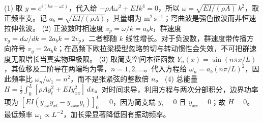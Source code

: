(1) 取 \(y=e^{i(kx-\omega t)}\)，代入给 \(-\rho A\omega^2+EI k^4=0\)，所以 \(\omega=\sqrt{EI/(\rho A)}\,k^2\)，取正频率支。记 \(a_b=\sqrt{EI/(\rho A)}\)，其量纲为 \(\mathrm{m^2\,s^{-1}}\)；弯曲波是强色散波而非恒速拉伸弦波。
(2) 正波数时相速度 \(v_p=\omega/k=a_b k\)，群速度 \(v_g=d\omega/dk=2a_bk=2v_p\)，二者都随 \(k\) 线性增长。对于负波数，群速度带传播方向符号 \(v_g=2a_bk\)；在高频下欧拉梁模型忽略剪切与转动惯性会失效，不可把群速度无限增长当真实物理极限。
(3) 取简支空间本征函数 \(Y_n(x)=\sin(n\pi x/L)\)，其位移及二阶导在两端均为零，\(n=1,2,\ldots\)。代入方程给 \(\omega_n=a_b(n\pi/L)^2\)，因此频率比 \(\omega_n/\omega_1=n^2\)，而不是张紧弦的整数倍 \(n\)。
(4) 总能量 \(H=\frac12\int_0^L[\rho A y_t^2+EI y_{xx}^2]\,dx\)。对时间求导，利用方程与两次分部积分，边界功率项为 \([EI(y_{xx}y_{xt}-y_{xxx}y_t)]_0^L=0\)，因为简支端 \(y_t=0\) 且 \(y_{xx}=0\)；故 \(\dot H=0\)。最低频率 \(\omega_1\propto L^{-2}\)，加长梁显著降低固有振动频率。
